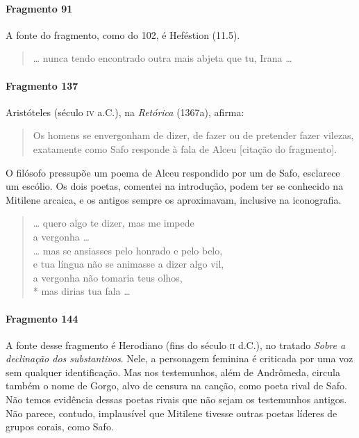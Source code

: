 \paragraph{Fragmento 91}

{\small A fonte do fragmento, como do 102, é Heféstion (11.5).}

\begin{verse}
\ldots{} nunca tendo encontrado outra mais abjeta que tu, Irana \ldots{}
\end{verse}

\paragraph{Fragmento 137}

{\small Aristóteles (século \textsc{iv} a.C.), na \textit{Retórica} (1367a), afirma: 

\begin{quote}
Os homens se envergonham de dizer, de fazer ou de pretender fazer vilezas, exatamente
como Safo responde à fala de Alceu [citação do fragmento].
\end{quote}

O filósofo pressupõe um poema de Alceu respondido por um de Safo, esclarece um escólio. Os
dois poetas, comentei na introdução, podem ter se conhecido na Mitilene arcaica, e
os antigos sempre os aproximavam, inclusive na iconografia. }

\begin{verse}
\ldots{} quero algo te dizer, mas me impede\\
a vergonha \ldots{}\\
\ldots{} mas se ansiasses pelo honrado e pelo belo,\\
e tua língua não se animasse a dizer algo vil,\\
a vergonha não tomaria teus olhos,\\*
mas dirias tua fala \ldots{}
\end{verse}

\paragraph{Fragmento 144}

{\small A fonte desse fragmento é Herodiano (fins do século \textsc{ii} d.C.), no tratado
\textit{Sobre a declinação dos substantivos}. Nele, a personagem feminina é
criticada por uma voz sem qualquer identificação. Mas nos testemunhos, além de Andrômeda, circula também o nome de Gorgo, alvo de censura na canção, como poeta rival de Safo. Não temos evidência dessas poetas rivais que não sejam os testemunhos antigos. Não parece, contudo, implausível que Mitilene tivesse outras poetas líderes de grupos corais, como Safo.}

